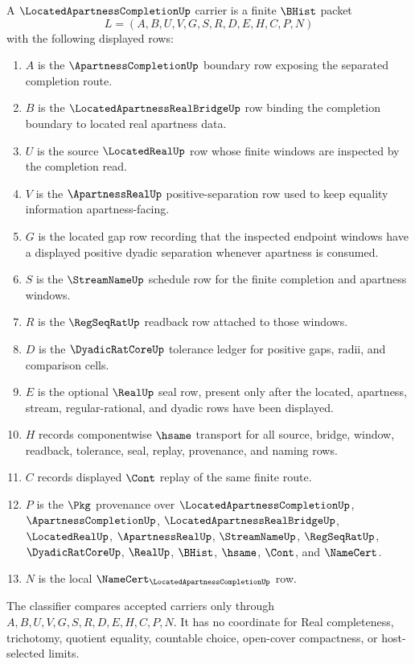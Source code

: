 \begin{definition}
\label{def:located-apartness-completion-carrier}
A $\LocatedApartnessCompletionUp$ carrier is a finite $\BHist$ packet
$$
L=(A,B,U,V,G,S,R,D,E,H,C,P,N)
$$
with the following displayed rows:
\begin{enumerate}
\item $A$ is the $\ApartnessCompletionUp$ boundary row exposing the separated completion route.
\item $B$ is the $\LocatedApartnessRealBridgeUp$ row binding the completion boundary to located real apartness data.
\item $U$ is the source $\LocatedRealUp$ row whose finite windows are inspected by the completion read.
\item $V$ is the $\ApartnessRealUp$ positive-separation row used to keep equality information apartness-facing.
\item $G$ is the located gap row recording that the inspected endpoint windows have a displayed positive dyadic separation whenever apartness is consumed.
\item $S$ is the $\StreamNameUp$ schedule row for the finite completion and apartness windows.
\item $R$ is the $\RegSeqRatUp$ readback row attached to those windows.
\item $D$ is the $\DyadicRatCoreUp$ tolerance ledger for positive gaps, radii, and comparison cells.
\item $E$ is the optional $\RealUp$ seal row, present only after the located, apartness, stream, regular-rational, and dyadic rows have been displayed.
\item $H$ records componentwise $\hsame$ transport for all source, bridge, window, readback, tolerance, seal, replay, provenance, and naming rows.
\item $C$ records displayed $\Cont$ replay of the same finite route.
\item $P$ is the $\Pkg$ provenance over $\LocatedApartnessCompletionUp$, $\ApartnessCompletionUp$, $\LocatedApartnessRealBridgeUp$, $\LocatedRealUp$, $\ApartnessRealUp$, $\StreamNameUp$, $\RegSeqRatUp$, $\DyadicRatCoreUp$, $\RealUp$, $\BHist$, $\hsame$, $\Cont$, and $\NameCert$.
\item $N$ is the local $\NameCert_{\LocatedApartnessCompletionUp}$ row.
\end{enumerate}
The classifier compares accepted carriers only through $A,B,U,V,G,S,R,D,E,H,C,P,N$. It has no coordinate for Real completeness, trichotomy, quotient equality, countable choice, open-cover compactness, or host-selected limits.
\end{definition}

